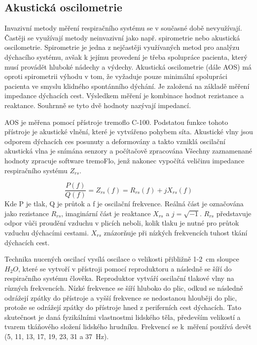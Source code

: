  \label{kap-metody}
\subsection {Akustická oscilometrie}
Invazivní metody měření respiračního systému se v současné době nevyužívají. Častěji se využívají metody neinvazivní jako např. spirometrie nebo akustická oscilometrie. Spirometrie je jedna z nejčastěji využívaných metod pro analýzu dýchacího systému, avšak k jejímu provedení je třeba spolupráce pacienta, který musí provádět hluboké nádechy a výdechy.
Akustická oscilometrie (dále AOS) má oproti spirometrii výhodu v tom, že vyžaduje pouze minimální spolupráci pacienta ve smyslu klidného spontánního dýchání. 
Je založená na základě měření impedance dýchacích cest. Výsledkem měření je kombinace hodnot rezistance a reaktance. Souhrnně se tyto dvě hodnoty nazývají impedancí. 

AOS je měřena pomocí přístroje tremoflo C-100. Podstatou funkce tohoto přístroje je akustické vlnění, které je vytvářeno pohybem síta. Akustické vlny jsou odporem dýchacích ces posunuty a deformovány a takto vzniklá oscilační akustická vlna je snímána senzory a počítačově zpracována
 Všechny zaznamenané hodnoty zpracuje software tremoFlo, jenž nakonec vypočítá veličinu impedance respiračního systému $Z_{rs}$. 

\begin{equation}
 \label{rce:1}
  \frac{P(f)}{Q(f)} = Z_{rs}(f) = R_{rs}(f) + j X_{rs}(f) 
\end{equation}
Kde P je tlak, Q je průtok a f je oscilační frekvence. 
Reálná část je označována jako rezistance $R_{rs}$, imaginární část je reaktance $X_{rs}$ a $j = \sqrt{-1}$. 
$R_{rs}$ představuje odpor vůči proudění vzduchu v plicích neboli, kolik tlaku je nutné pro průtok vzduchu dýchacími cestami. $X_{rs}$ znázorňuje při nízkých frekvencích tuhost tkání dýchacích cest. 


Technika nucených oscilací vysílá oscilace o velikosti přibližně 1-2~cm sloupce $H_{2}O$, které se vytvoří v přístroji pomocí reproduktoru a následně se šíří do respiračního systému člověka. Reproduktor vytváří oscilační tlakové vlny na různých frekvencích. Nízké frekvence se šíří hluboko do plic, odkud se následně odrážejí zpátky do přístroje a vyšší frekvence se nedostanou hlouběji do plic, protože se  odrážejí zpátky do přístroje hned z periferních cest dýchacích. Tato skutečnost je daná fyzikálními vlastnostmi lidského těla, především velikostí a tvarem tkáňového složení lidského hrudníku. \cite{Vlcek2018} Frekvencí se k~měření používá devět (5, 11, 13, 17, 19, 23, 31 a 37~Hz). 

